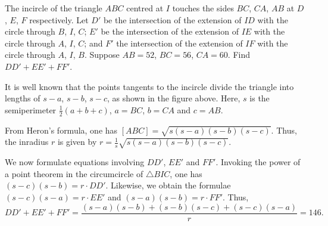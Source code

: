 \clearpage
\begin{question}[146]\label{Q::2024-O-1-25}
    The incircle of the triangle $ABC$ centred at $I$ touches the sides $BC$, $CA$, $AB$ at $D$, $E$, $F$ respectively. Let $D'$ be the intersection of the extension of $ID$ with the circle through $B$, $I$, $C$; $E'$ be the intersection of the extension of $IE$ with the circle through $A$, $I$, $C$; and $F'$ the intersection of the extension of $IF$ with the circle through $A$, $I$, $B$. Suppose $AB = 52$, $BC = 56$, $CA = 60$. Find $DD' + EE' + FF'$.
\end{question}
\begin{center}
\end{center}
\begin{solution*}
    It is well known that the points tangents to the incircle divide the triangle into lengths of $s-a$, $s-b$, $s-c$, as shown in the figure above. Here, $s$ is the semiperimeter $\frac12(a+b+c)$, $a = BC$, $b = CA$ and $c = AB$.

    From Heron's formula, one has $[ABC] = \sqrt{s(s-a)(s-b)(s-c)}$. Thus, the inradius $r$ is given by $r = \frac1s \sqrt{s(s-a)(s-b)(s-c)}$.

    We now formulate equations involving $DD'$, $EE'$ and $FF'$. Invoking the power of a point theorem in the circumcircle of $\triangle BIC$, one has $(s-c)(s-b) = r \cdot DD'$. Likewise, we obtain the formulae $(s-c)(s-a) = r \cdot EE'$ and $(s-a)(s-b) = r \cdot FF'$. Thus, \[DD' + EE' + FF' = \frac{(s-a)(s-b) + (s-b)(s-c) + (s-c)(s-a)}r = 146.\]
\end{solution*}
